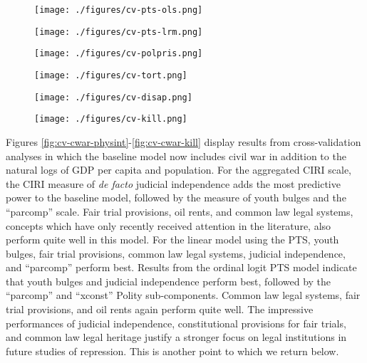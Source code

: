 \documentclass[12pt]{article}
\begin{document}
\begin{figure}[!htpb]
\centering
\texttt{[image: ./figures/cv-pts-ols.png]}
\caption{}
\label{fig:cv-pts-ols}
\end{figure}

\begin{figure}[!htpb]
\centering
\texttt{[image: ./figures/cv-pts-lrm.png]}
\caption{}
\label{fig:cv-pts-lrm}
\end{figure}

\begin{figure}[!htpb]
\centering
\texttt{[image: ./figures/cv-polpris.png]}
\caption{}
\label{fig:cv-polpris}
\end{figure}

\begin{figure}[!htpb]
\centering
\texttt{[image: ./figures/cv-tort.png]}
\caption{}
\label{fig:cv-tort}
\end{figure}

\begin{figure}[!htpb]
\centering
\texttt{[image: ./figures/cv-disap.png]}
\caption{}
\label{fig:cv-disap}
\end{figure}

\begin{figure}[!htpb]
\centering
\texttt{[image: ./figures/cv-kill.png]}
\caption{}
\label{fig:cv-kill}
\end{figure}

Figures \ref{fig:cv-cwar-physint}-\ref{fig:cv-cwar-kill} display results from cross-validation analyses in which the baseline model now includes civil war in addition to the natural logs of GDP per capita and population. For the aggregated CIRI scale, the CIRI measure of {\it de facto} judicial independence adds the most predictive power to the baseline model, followed by the measure of youth bulges and the ``parcomp'' scale. Fair trial provisions, oil rents, and common law legal systems, concepts which have only recently received attention in the literature, also perform quite well in this model. For the linear model using the PTS, youth bulges, fair trial provisions, common law legal systems, judicial independence, and ``parcomp'' perform best. Results from the ordinal logit PTS model indicate that youth bulges and judicial independence perform best, followed by the ``parcomp''  and ``xconst'' Polity sub-components. Common law legal systems, fair trial provisions, and oil rents again perform quite well. The impressive performances of  judicial independence, constitutional provisions for fair trials, and common law legal heritage justify a stronger focus on legal institutions in future studies of repression. This is another point to which we return below. 
\end{document}
